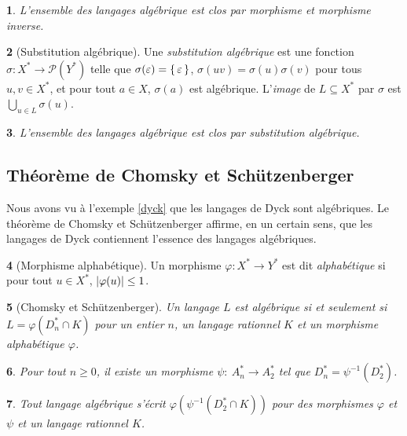 \documentclass[10pt,a4paper,notitlepage]{article}
\theoremstyle{plain}
\newtheorem{thm}{\protect\theoremname}
\theoremstyle{definition}
\newtheorem{defn}[thm]{\protect\definitionname}
\theoremstyle{definition}
\theoremstyle{remark}
\theoremstyle{remark}
\theoremstyle{plain}
\newtheorem{lem}[thm]{\protect\lemmaname}
\theoremstyle{plain}
\newtheorem{prop}[thm]{\protect\propositionname}
\theoremstyle{plain}
\newtheorem{cor}[thm]{\protect\corollaryname}
\theoremstyle{remark}
\providecommand{\corollaryname}{Corollaire}
\providecommand{\definitionname}{Définition}
\providecommand{\lemmaname}{Lemme}
\providecommand{\propositionname}{Proposition}
\providecommand{\theoremname}{Théorème}
\begin{document}
\begin{prop}
	L'ensemble des langages algébrique est clos par morphisme et morphisme inverse.
\end{prop}

\begin{defn}[Substitution algébrique]
	Une \emph{substitution algébrique} est une fonction $\sigma:X^*\to \mathcal{P}(Y^*)$ telle que $\sigma(\varepsilon)=\set{\varepsilon}$, $\sigma(uv)=\sigma(u)\sigma(v)$ pour tous $u,v\in X ^*$, et pour tout $a\in X$, $\sigma(a)$ est algébrique. L'\emph{image} de $L\subseteq X^*$ par $\sigma$ est $\underset{u\in L}{\bigcup}\sigma(u)$.
\end{defn}

\begin{prop}
	L'ensemble des langages algébrique est clos par substitution algébrique.
\end{prop}

\subsection{Théorème de Chomsky et Schützenberger} %

Nous avons vu à l'exemple \ref{dyck} que les langages de Dyck sont algébriques. Le théorème de Chomsky et Schützenberger affirme, en un certain sens, que les langages de Dyck contiennent l'essence des langages algébriques.

\begin{defn}[Morphisme alphabétique]
	Un morphisme $\varphi:X^*\to Y^*$ est dit \emph{alphabétique} si pour tout $u\in X^*$, $\left|\varphi(u)\right| \le 1$.
\end{defn}

\begin{thm}[Chomsky et Schützenberger]
	Un langage $L$ est algébrique si et seulement si $L=\varphi(D^*_n\cap K)$ pour un entier $n$, un langage rationnel $K$ et un morphisme alphabétique $\varphi$.
\end{thm}

\begin{lem}
	Pour tout $n \ge 0$, il existe un morphisme $\psi:\ A_{n}^{*}\to A_{2}^{*}$ tel que $D_{n}^{*}=\psi^{-1}\left(D_{2}^{*}\right)$.
\end{lem}

\begin{cor}
	Tout langage algébrique s'écrit $\varphi\left(\psi^{-1}\left(D_{2}^{*}\cap K\right)\right)$
	pour des morphismes $\varphi$ et $\psi$ et un langage rationnel
	$K$.
\end{cor}
\end{document}
